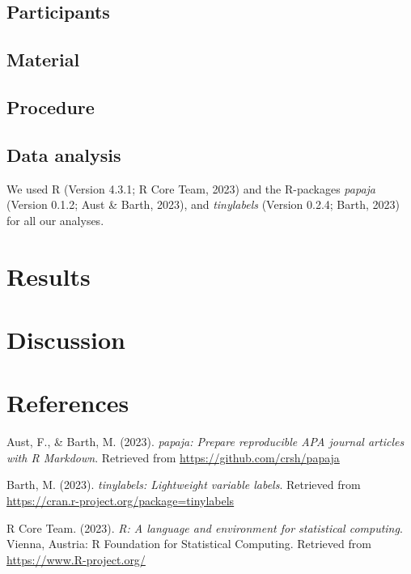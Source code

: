 \documentclass[
  man,floatsintext]{apa6}
\newlength{\cslhangindent}
\newlength{\cslentryspacingunit} %
\newenvironment{CSLReferences}[2] %
 {%
  \setlength{\parindent}{0pt}
  \ifodd #1
  \let\oldpar\par
  \def\par{\hangindent=\cslhangindent\oldpar}
  \fi
  \setlength{\parskip}{#2\cslentryspacingunit}
 }%
 {}
\begin{document}
\hypertarget{participants}{%
\subsection{Participants}\label{participants}}

\hypertarget{material}{%
\subsection{Material}\label{material}}

\hypertarget{procedure}{%
\subsection{Procedure}\label{procedure}}

\hypertarget{data-analysis}{%
\subsection{Data analysis}\label{data-analysis}}

We used R (Version 4.3.1; R Core Team, 2023) and the R-packages \emph{papaja} (Version 0.1.2; Aust \& Barth, 2023), and \emph{tinylabels} (Version 0.2.4; Barth, 2023) for all our analyses.

\hypertarget{results}{%
\section{Results}\label{results}}

\hypertarget{discussion}{%
\section{Discussion}\label{discussion}}

\newpage

\hypertarget{references}{%
\section{References}\label{references}}

\hypertarget{refs}{}
\begin{CSLReferences}{1}{0}
\leavevmode{}%
Aust, F., \& Barth, M. (2023). \emph{{papaja}: {Prepare} reproducible {APA} journal articles with {R Markdown}}. Retrieved from \url{https://github.com/crsh/papaja}

\leavevmode{}%
Barth, M. (2023). \emph{{tinylabels}: Lightweight variable labels}. Retrieved from \url{https://cran.r-project.org/package=tinylabels}

\leavevmode{}%
R Core Team. (2023). \emph{R: A language and environment for statistical computing}. Vienna, Austria: R Foundation for Statistical Computing. Retrieved from \url{https://www.R-project.org/}

\end{CSLReferences}
\end{document}
